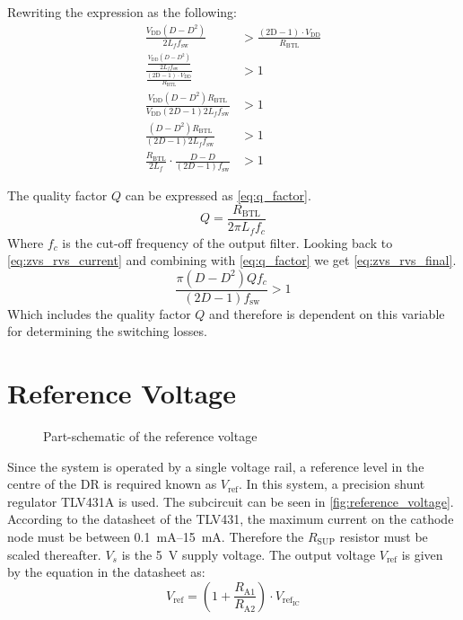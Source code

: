 Rewriting the expression as the following:
\begin{equation} \label{eq:zvs_rvs_current2}
	\begin{split}
		\frac{V_{\mathrm{DD}} (D - D^{2})}{2 L_{f}f_{\mathrm{sw}}} &> \frac{\left( 2\mathrm{D} - 1 \right) \cdot V_{\mathrm{DD}}}{R_{\mathrm{BTL}}} \\
		\frac{\frac{V_{\mathrm{DD}} (D - D^{2})}{2 L_{f}f_{\mathrm{sw}}}}{\frac{\left( 2\mathrm{D} - 1 \right) \cdot V_{\mathrm{DD}}}{R_{\mathrm{BTL}}}} &> 1 \\
		\frac{V_{\mathrm{DD}} (D - D^{2})R_{\mathrm{BTL}}}{V_{\mathrm{DD}} (2D-1) 2L_{f} f_{\mathrm{sw}}} &> 1 \\
		\frac{(D-D^{2})R_{\mathrm{BTL}}}{(2D-1) 2L_{f}f_{\mathrm{sw}}} &> 1 \\
		\frac{R_{\mathrm{BTL}}}{2L_{f}} \cdot \frac{D-D}{(2D-1)f_{\mathrm{sw}}} &> 1
	\end{split}
\end{equation}

The quality factor $Q$ can be expressed as \autoref{eq:q_factor}.
\begin{equation} \label{eq:q_factor}
	Q = \frac{R_{\mathrm{BTL}}}{2\pi L_{f}f_{c}}
\end{equation}
Where $f_{c}$ is the cut-off frequency of the output filter. Looking back to \autoref{eq:zvs_rvs_current} and combining with \autoref{eq:q_factor} we get \autoref{eq:zvs_rvs_final}.
\begin{equation} \label{eq:zvs_rvs_final}
	\frac{\pi (D-D^{2}) Q f_{c}}{(2D-1) f_{\mathrm{sw}}} > 1
\end{equation}
Which includes the quality factor $Q$ and therefore is dependent on this variable for determining the switching losses.

\section{Reference Voltage}
\begin{figure}[H]
	\centering
	\begin{circuitikz}
		
	\end{circuitikz}
	\caption{Part-schematic of the reference voltage}
	\label{fig:reference_voltage}
\end{figure}

Since the system is operated by a single voltage rail, a reference level in the centre of the DR is required known as $V_{\mathrm{ref}}$. In this system, a precision shunt regulator TLV431A \cite{tlv431} is used. The subcircuit can be seen in \autoref{fig:reference_voltage}. 
According to the datasheet of the TLV431, the maximum current on the cathode node must be between \SIrange{0.1}{15}{\milli\ampere}. Therefore the $R_{\mathrm{SUP}}$ resistor must be scaled thereafter. $V_{s}$ is the \SI{5}{\volt} supply voltage. 
The output voltage $V_{\mathrm{ref}}$ is given by the equation in the datasheet as:
\begin{equation} \label{eq:reference_voltage}
	V_{\mathrm{ref}} = \left( 1 + \frac{R_{\mathrm{A1}}}{R_{\mathrm{A2}}} \right) \cdot V_{\mathrm{ref}_{\mathrm{IC}}}
\end{equation}

